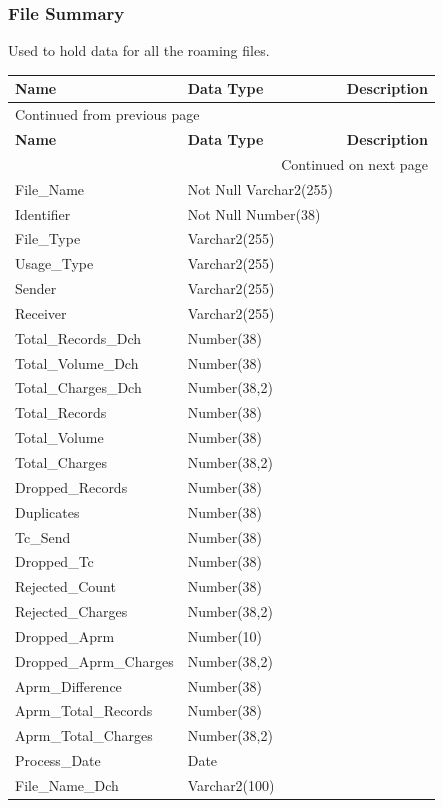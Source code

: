 \documentclass[12pt,twoside]{article}
\begin{document}
\subsubsection{File Summary}
\label{sec:orgheadline148}
Used to hold data for all the roaming files.
\footnotesize
\begin{longtable}{l|l|l}
\hline
\textbf{Name} & \textbf{Data Type} & \textbf{Description}\\
\hline
\endfirsthead
\multicolumn{3}{l}{Continued from previous page} \\
\hline

\textbf{Name} & \textbf{Data Type} & \textbf{Description} \\

\hline
\endhead
\hline\multicolumn{3}{r}{Continued on next page} \\
\endfoot
\endlastfoot
\hline
File\_Name & Not Null Varchar2(255) & \\
Identifier & Not Null Number(38) & \\
File\_Type & Varchar2(255) & \\
Usage\_Type & Varchar2(255) & \\
Sender & Varchar2(255) & \\
Receiver & Varchar2(255) & \\
Total\_Records\_Dch & Number(38) & \\
Total\_Volume\_Dch & Number(38) & \\
Total\_Charges\_Dch & Number(38,2) & \\
Total\_Records & Number(38) & \\
Total\_Volume & Number(38) & \\
Total\_Charges & Number(38,2) & \\
Dropped\_Records & Number(38) & \\
Duplicates & Number(38) & \\
Tc\_Send & Number(38) & \\
Dropped\_Tc & Number(38) & \\
Rejected\_Count & Number(38) & \\
Rejected\_Charges & Number(38,2) & \\
Dropped\_Aprm & Number(10) & \\
Dropped\_Aprm\_Charges & Number(38,2) & \\
Aprm\_Difference & Number(38) & \\
Aprm\_Total\_Records & Number(38) & \\
Aprm\_Total\_Charges & Number(38,2) & \\
Process\_Date & Date & \\
File\_Name\_Dch & Varchar2(100) & \\
\hline
\end{longtable}
\end{document}
